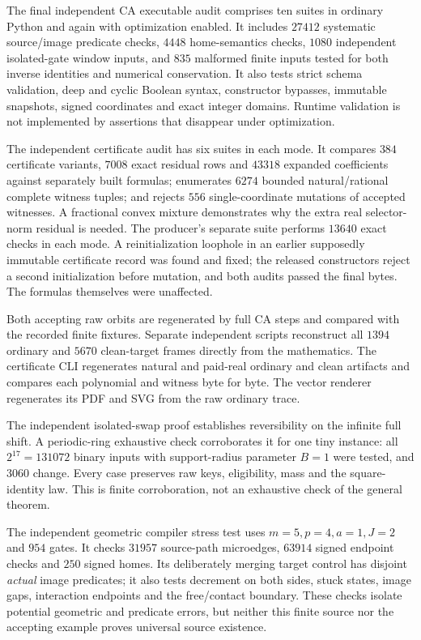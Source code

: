 \documentclass[11pt,a4paper]{article}
\numberwithin{equation}{section}
\begin{document}
The final independent CA executable audit comprises ten suites in ordinary
Python and again with optimization enabled. It includes $27412$ systematic
source/image predicate checks, $4448$ home-semantics checks, $1080$ independent
isolated-gate window inputs, and $835$ malformed finite inputs tested for both
inverse identities and numerical conservation. It also tests strict schema
validation, deep and cyclic Boolean syntax, constructor bypasses, immutable
snapshots, signed coordinates and exact integer domains. Runtime validation
is not implemented by assertions that disappear under optimization.

The independent certificate audit has six suites in each mode. It compares
$384$ certificate variants, $7008$ exact residual rows and $43318$ expanded
coefficients against separately built formulas; enumerates $6274$ bounded
natural/rational complete witness tuples; and rejects $556$ single-coordinate
mutations of accepted witnesses. A fractional convex mixture demonstrates
why the extra real selector-norm residual is needed. The producer's separate
suite performs $13640$ exact checks in each mode. A reinitialization loophole
in an earlier supposedly immutable certificate record was found and fixed;
the released constructors reject a second initialization before mutation, and
both audits passed the final bytes. The formulas themselves were unaffected.

Both accepting raw orbits are regenerated by full CA steps and compared with
the recorded finite fixtures. Separate independent scripts reconstruct all
$1394$ ordinary and $5670$ clean-target frames directly from the mathematics.
The certificate CLI regenerates natural and paid-real ordinary and clean
artifacts and compares each polynomial and witness byte for byte. The vector
renderer regenerates its PDF and SVG from the raw ordinary trace.

The independent isolated-swap proof establishes reversibility on the infinite
full shift. A periodic-ring exhaustive check corroborates it for one tiny
instance: all $2^{17}=131072$ binary inputs with support-radius parameter
$B=1$ were tested, and $3060$ change. Every case preserves raw keys,
eligibility, mass and the square-identity law. This is finite corroboration,
not an exhaustive check of the general theorem.

The independent geometric compiler stress test uses $m=5,p=4,a=1,J=2$ and
$954$ gates. It checks $31957$ source-path microedges, $63914$ signed endpoint
checks and $250$ signed homes. Its deliberately merging target control has
disjoint \emph{actual} image predicates; it also tests decrement on both
sides, stuck states, image gaps, interaction endpoints and the free/contact
boundary. These checks isolate potential geometric and predicate errors,
but neither this finite source nor the accepting example proves universal
source existence.
\end{document}
